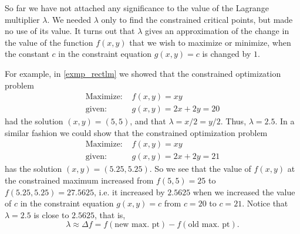 
So far we have not attached any significance to the value of the Lagrange multiplier $\lambda$. We needed $\lambda$ only to find the constrained critical points, but made no use of its value. It turns out that $\lambda$ gives an approximation of the change in the value of the function $f(x,y)$ that we wish to maximize or minimize, when
the constant $c$ in the constraint equation $g(x,y)=c$ is changed by $1$.

For example, in \autoref{exmp_rectlm} we showed that the constrained optimization problem
\begin{align*}
  \text{Maximize: }& f(x,y) = xy\\
  \text{given: }& g(x,y) = 2x + 2y = 20
\end{align*}
had the solution $(x,y) = (5,5)$, and that $\lambda = x/2 = y/2$. Thus, $\lambda = 2.5$. In a similar fashion we could show that the constrained optimization problem
\begin{align*}
  \text{Maximize: }& f(x,y) = xy\\
  \text{given: }& g(x,y) = 2x + 2y = 21
\end{align*}
has the solution $(x,y) = (5.25,5.25)$. So we see that the value of $f(x,y)$ at the constrained maximum increased from
$f(5,5)=25$ to $f(5.25,5.25)=27.5625$, i.e. it increased by $2.5625$ when we increased the value of $c$ in the constraint
equation $g(x,y)=c$ from $c=20$ to $c=21$. Notice that $\lambda = 2.5$ is close to $2.5625$, that is,
\[\lambda\approx\Delta f=f(\text{new max. pt})-f(\text{old max. pt}).\]

